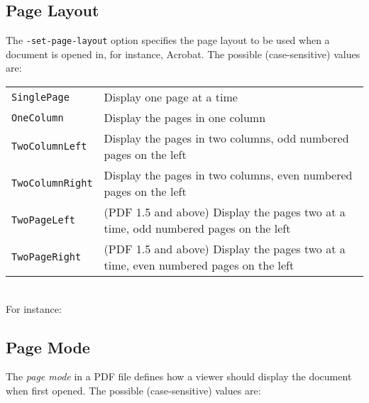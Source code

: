 \documentclass{book}
\begin{document}
  \subsection{Page Layout}
  The \texttt{-set-page-layout} option specifies the page layout to be used
when a document is opened in, for instance, Acrobat. The possible
(case-sensitive) values are:

\vspace{2mm}
  {\small\begin{tabular}{ll}
    \texttt{SinglePage} & \vspace{2mm} \parbox{8cm}{Display one page at a time} \\
    \texttt{OneColumn} & \vspace{2mm} \parbox{8cm}{Display the pages in one column} \\
    \texttt{TwoColumnLeft} & \vspace{2mm} \parbox{8cm}{Display the pages in two columns, odd numbered pages on the left} \\
    \texttt{TwoColumnRight} & \vspace{2mm} \parbox{8cm}{Display the pages in two columns, even numbered pages on the left} \\
    \texttt{TwoPageLeft} & \vspace{2mm} \parbox{8cm}{(PDF 1.5 and above) Display the pages two at a time, odd numbered pages on the left} \\
    \texttt{TwoPageRight} & \vspace{2mm} \parbox{8cm}{(PDF 1.5 and above) Display the pages two at a time, even numbered pages on the left}
  \end{tabular}}\\


  \noindent For instance:

\noindent{}

  \subsection{Page Mode}
  The \textit{page mode} in a PDF file defines how a viewer should display the
document when first opened. The possible (case-sensitive) values are:
\end{document}
